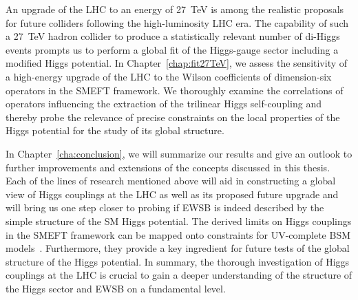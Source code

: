 An upgrade of the LHC to an energy of 27~TeV is among the realistic proposals 
for future colliders following the high-luminosity LHC era. 
The capability of such a 27~TeV hadron collider to produce a statistically 
relevant number of di-Higgs events prompts us to perform a global fit 
of the Higgs-gauge sector including a modified Higgs potential.
In Chapter~\ref{chap:fit27TeV}, we assess the sensitivity of a high-energy upgrade 
of the LHC to the Wilson coefficients of dimension-six operators in the SMEFT framework. 
We thoroughly examine the correlations of operators influencing 
the extraction of the trilinear Higgs self-coupling and thereby probe 
the relevance of precise constraints on the local properties of the Higgs 
potential for the study of its global structure.
\\ \medskip \vspace*{-2pt}





In Chapter~\ref{cha:conclusion}, we will summarize our results and give an 
outlook to further improvements and extensions of the concepts discussed 
in this thesis. 
%
Each of the lines of research mentioned above will aid in constructing a global view of Higgs 
couplings at the LHC as well as its proposed future upgrade 
and will bring us one step closer to probing if EWSB
is indeed described by the simple structure of the SM Higgs potential.
The derived limits on Higgs couplings in the SMEFT framework 
can be mapped onto constraints for UV-complete BSM models~\cite{deBlas:2017xtg,Ellis:2018gqa}.
Furthermore, they provide a key ingredient for future tests of the global structure of the Higgs potential. 
In summary, the thorough investigation of Higgs couplings at the LHC is crucial 
to gain a deeper understanding of the structure of the Higgs sector and EWSB on a fundamental level.
\enlargethispage{2ex}


%
